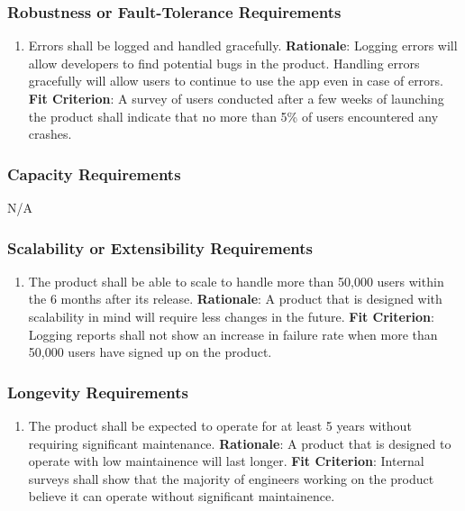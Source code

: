 \documentclass[12pt]{article}
\begin{document}
\subsubsection{Robustness or Fault-Tolerance Requirements}
\begin{enumerate}[nfr]
    \item Errors shall be logged and handled gracefully. 
    \newline \textbf{Rationale}: Logging errors will allow developers to find potential bugs in the product. Handling errors gracefully will allow users to continue to use the app even in case of errors.
    \newline \textbf{Fit Criterion}: A survey of users conducted after a few weeks of launching the product shall indicate that no more than 5\% of users encountered any crashes.
\end{enumerate}

\subsubsection{Capacity Requirements}
N/A

\subsubsection{Scalability or Extensibility Requirements}
\begin{enumerate}[nfr]
  \item The product shall be able to scale to handle more than 50,000 users within the 6 months after its release. 
  \newline \textbf{Rationale}: A product that is designed with scalability in mind will require less changes in the future.
  \newline \textbf{Fit Criterion}: Logging reports shall not show an increase in failure rate when more than 50,000 users have signed up on the product.
\end{enumerate}

\subsubsection{Longevity Requirements}
\begin{enumerate}[nfr]
    \item The product shall be expected to operate for at least 5 years without requiring significant maintenance.
    \newline \textbf{Rationale}: A product that is designed to operate with low maintainence will last longer.
    \newline \textbf{Fit Criterion}: Internal surveys shall show that the majority of engineers working on the product believe it can operate without significant maintainence.
\end{enumerate}
\end{document}
